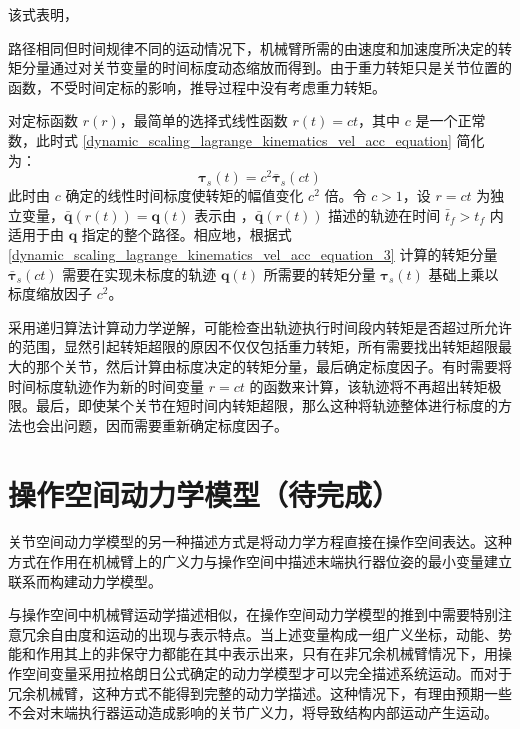 \documentclass[cn,11pt,chinese,blue,bibstyle=ieeetr]{elegantbook}
\begin{document}
该式表明，{路径相同但时间规律不同的运动情况下，机械臂所需的由速度和加速度所决定的转矩分量通过对关节变量的时间标度动态缩放而得到。由于重力转矩只是关节位置的函数，不受时间定标的影响，推导过程中没有考虑重力转矩。

对定标函数 $r\left(r\right)$，最简单的选择式线性函数 $r\left(t\right) = ct$，其中 $c$ 是一个正常数，此时式 \ref{dynamic_scaling_lagrange_kinematics_vel_acc_equation} 简化为：
$$\bm{\tau}_s\left(t\right) = c^2\bm{\bar{\tau}}_s\left(ct\right)$$
此时由 $c$ 确定的线性时间标度使转矩的幅值变化 $c^2$ 倍。令 $c>1$，设 $r = ct$ 为独立变量，$\bm{\bar{q}}\left(r\left(t\right)\right) = \bm{q}\left(t\right)$ 表示由 ，$\bm{\bar{q}}\left(r\left(t\right)\right)$ 描述的轨迹在时间 $\bar{t}_f>t_f$ 内适用于由 $\bm{q}$ 指定的整个路径。相应地，根据式 \ref{dynamic_scaling_lagrange_kinematics_vel_acc_equation_3} 计算的转矩分量 $\bm{\bar{\tau}}_s\left(ct\right)$ 需要在实现未标度的轨迹 $\bm{q}\left(t\right)$ 所需要的转矩分量 $\bm{\tau}_s\left(t\right)$ 基础上乘以标度缩放因子 $c^2$。

采用递归算法计算动力学逆解，可能检查出轨迹执行时间段内转矩是否超过所允许的范围，显然引起转矩超限的原因不仅仅包括重力转矩，所有需要找出转矩超限最大的那个关节，然后计算由标度决定的转矩分量，最后确定标度因子。有时需要将时间标度轨迹作为新的时间变量 $r = ct$ 的函数来计算，该轨迹将不再超出转矩极限。最后，即使某个关节在短时间内转矩超限，那么这种将轨迹整体进行标度的方法也会出问题，因而需要重新确定标度因子。


\section{操作空间动力学模型（待完成）}

关节空间动力学模型的另一种描述方式是将动力学方程直接在操作空间表达。这种方式在作用在机械臂上的广义力与操作空间中描述末端执行器位姿的最小变量建立联系而构建动力学模型。

与操作空间中机械臂运动学描述相似，在操作空间动力学模型的推到中需要特别注意冗余自由度和运动的出现与表示特点。当上述变量构成一组广义坐标，动能、势能和作用其上的非保守力都能在其中表示出来，只有在非冗余机械臂情况下，用操作空间变量采用拉格朗日公式确定的动力学模型才可以完全描述系统运动。而对于冗余机械臂，这种方式不能得到完整的动力学描述。这种情况下，有理由预期一些不会对末端执行器运动造成影响的关节广义力，将导致结构内部运动产生运动。

}
\end{document}
